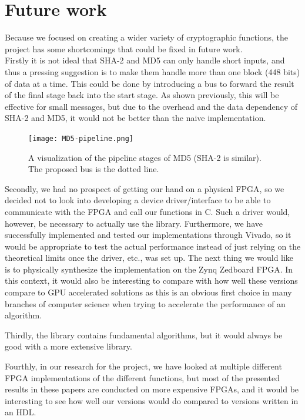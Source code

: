 \documentclass[a4paper, openany]{book}
\begin{document}
\section{Future work}
\label{sec:orgacaa1b8}
Because we focused on creating a wider variety of cryptographic functions, the project has some shortcomings that could be fixed in future work.\\

Firstly it is not ideal that SHA-2 and MD5 can only handle short inputs, and thus a pressing suggestion is to make them handle more than one block (448 bits) of data at a time. This could be done by introducing a bus to forward the result of the final stage back into the start stage. As shown previously, this will be effective for small messages, but due to the overhead and the data dependency of SHA-2 and MD5, it would not be better than the naive implementation.

\begin{figure}[H]
\centering
\captionsetup{width=.8\linewidth}
\texttt{[image: MD5-pipeline.png]}
\caption{A visualization of the pipeline stages of MD5 (SHA-2 is similar). The proposed bus is the dotted line.}
\label{fig:MD5-pipe}
\end{figure}

Secondly, we had no prospect of getting our hand on a physical FPGA, so we decided not to look into developing a device driver/interface to be able to communicate with the FPGA and call our functions in C. Such a driver would, however, be necessary to actually use the library. Furthermore, we have successfully implemented and tested our implementations through Vivado, so it would be appropriate to test the actual performance instead of just relying on the theoretical limits once the driver, etc., was set up. The next thing we would like is to physically synthesize the implementation on the Zynq Zedboard FPGA. In this context, it would also be interesting to compare with how well these versions compare to GPU accelerated solutions as this is an obvious first choice in many branches of computer science when trying to accelerate the performance of an algorithm.

Thirdly, the library contains fundamental algorithms, but it would always be good with a more extensive library.

Fourthly, in our research for the project, we have looked at multiple different FPGA implementations of the different functions, but most of the presented results in these papers are conducted on more expensive FPGAs, and it would be interesting to see how well our versions would do compared to versions written in an HDL.
\end{document}
